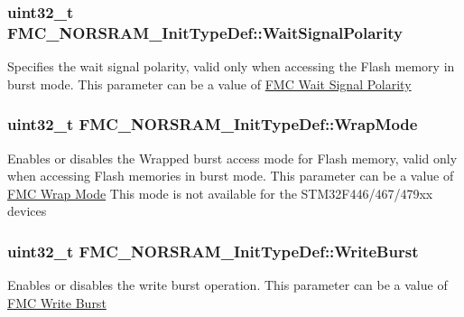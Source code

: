 \subsubsection[{\texorpdfstring{Wait\+Signal\+Polarity}{WaitSignalPolarity}}]{\setlength{\rightskip}{0pt plus 5cm}uint32\+\_\+t F\+M\+C\+\_\+\+N\+O\+R\+S\+R\+A\+M\+\_\+\+Init\+Type\+Def\+::\+Wait\+Signal\+Polarity}\hypertarget{struct_f_m_c___n_o_r_s_r_a_m___init_type_def_ac32cd637777b91e2898d2a661df4facb}{}\label{struct_f_m_c___n_o_r_s_r_a_m___init_type_def_ac32cd637777b91e2898d2a661df4facb}
Specifies the wait signal polarity, valid only when accessing the Flash memory in burst mode. This parameter can be a value of \hyperlink{group___f_m_c___wait___signal___polarity}{F\+MC Wait Signal Polarity} 
\subsubsection[{\texorpdfstring{Wrap\+Mode}{WrapMode}}]{\setlength{\rightskip}{0pt plus 5cm}uint32\+\_\+t F\+M\+C\+\_\+\+N\+O\+R\+S\+R\+A\+M\+\_\+\+Init\+Type\+Def\+::\+Wrap\+Mode}\hypertarget{struct_f_m_c___n_o_r_s_r_a_m___init_type_def_a1f1343fd5065e0280060394c5c00303a}{}\label{struct_f_m_c___n_o_r_s_r_a_m___init_type_def_a1f1343fd5065e0280060394c5c00303a}
Enables or disables the Wrapped burst access mode for Flash memory, valid only when accessing Flash memories in burst mode. This parameter can be a value of \hyperlink{group___f_m_c___wrap___mode}{F\+MC Wrap Mode} This mode is not available for the S\+T\+M32\+F446/467/479xx devices 
\subsubsection[{\texorpdfstring{Write\+Burst}{WriteBurst}}]{\setlength{\rightskip}{0pt plus 5cm}uint32\+\_\+t F\+M\+C\+\_\+\+N\+O\+R\+S\+R\+A\+M\+\_\+\+Init\+Type\+Def\+::\+Write\+Burst}\hypertarget{struct_f_m_c___n_o_r_s_r_a_m___init_type_def_a39fda8766e93963f67170f40f2983e87}{}\label{struct_f_m_c___n_o_r_s_r_a_m___init_type_def_a39fda8766e93963f67170f40f2983e87}
Enables or disables the write burst operation. This parameter can be a value of \hyperlink{group___f_m_c___write___burst}{F\+MC Write Burst} 
